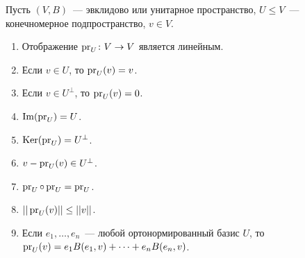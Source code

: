 \begin{theorem}\label{thm:orth-proj-properties}
Пусть $(V,B)$~--- эвклидово или унитарное пространство,
$U\leq V$~--- конечномерное подпространство, $v\in V$.
\begin{enumerate}
\item\label{num:orth-proj-props-1}
Отображение $\operatorname{pr}_U\colon V\to V$ является линейным.
\item\label{num:orth-proj-props-2}
Если $v\in U$, то $\operatorname{pr}_U(v) = v$.
\item\label{num:orth-proj-props-3}
Если $v\in U^\perp$, то $\operatorname{pr}_U(v) = 0$.
\item $\operatorname{Im}(\operatorname{pr}_U) = U$.
\item $\operatorname{Ker}(\operatorname{pr}_U) = U^\perp$.
\item $v - \operatorname{pr}_U(v) \in U^\perp$.
\item $\operatorname{pr}_U\circ\operatorname{pr}_U = \operatorname{pr}_U$.
\item $||\operatorname{pr}_U(v)|| \leq ||v||$.
\item Если $e_1,\dots,e_n$~--- любой ортонормированный базис $U$,
то $\operatorname{pr}_U(v) = e_1 B(e_1,v) + \dots + e_n B(e_n,v)$.
\end{enumerate}
\end{theorem}
